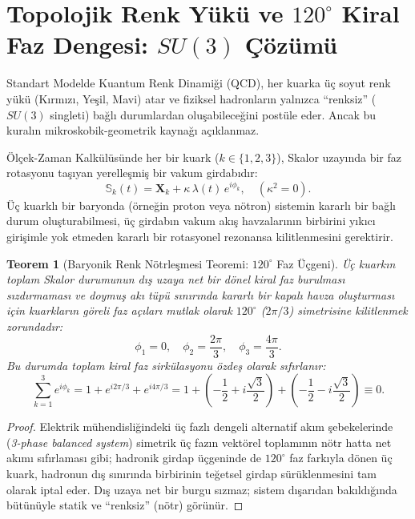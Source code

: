 \documentclass[11pt,a4paper]{article}
\newtheorem{theorem}{Teorem}[section]
\begin{document}
\section{Topolojik Renk Yükü ve \texorpdfstring{$120^\circ$}{120 Derece} Kiral Faz Dengesi: \texorpdfstring{$SU(3)$}{SU(3)} Çözümü}
\label{sec:topolojik_renk_yuku_p3}

Standart Modelde Kuantum Renk Dinamiği (QCD), her kuarka üç soyut renk yükü (Kırmızı, Yeşil, Mavi) atar ve fiziksel hadronların yalnızca ``renksiz'' ($SU(3)$ singleti) bağlı durumlardan oluşabileceğini postüle eder. Ancak bu kuralın mikroskobik-geometrik kaynağı açıklanmaz.

Ölçek-Zaman Kalkülüsünde her bir kuark ($k \in \{1, 2, 3\}$), Skalor uzayında bir faz rotasyonu taşıyan yerelleşmiş bir vakum girdabıdır:
\begin{equation}
    \mathbb{S}_k(t) = \mathbf{X}_k + \kappa \, \lambda(t) \, e^{i \phi_k}, \quad (\kappa^2 = 0).
    \label{eq:kuark_skalor_faz_p3}
\end{equation}
Üç kuarklı bir baryonda (örneğin proton veya nötron) sistemin kararlı bir bağlı durum oluşturabilmesi, üç girdabın vakum akış havzalarının birbirini yıkıcı girişimle yok etmeden kararlı bir rotasyonel rezonansa kilitlenmesini gerektirir.

\begin{theorem}[Baryonik Renk Nötrleşmesi Teoremi: $120^\circ$ Faz Üçgeni]
    \label{thm:renk_notrlesmesi_p3}
    Üç kuarkın toplam Skalor durumunun dış uzaya net bir dönel kiral faz burulması sızdırmaması ve doymuş akı tüpü sınırında kararlı bir kapalı havza oluşturması için kuarkların göreli faz açıları mutlak olarak $120^\circ$ ($2\pi/3$) simetrisine kilitlenmek zorundadır:
    \begin{equation}
        \phi_1 = 0, \quad \phi_2 = \frac{2\pi}{3}, \quad \phi_3 = \frac{4\pi}{3}.
        \label{eq:faz_acilari_120_p3}
    \end{equation}
    Bu durumda toplam kiral faz sirkülasyonu özdeş olarak sıfırlanır:
    \begin{equation}
        \sum_{k=1}^3 e^{i \phi_k} = 1 + e^{i 2\pi/3} + e^{i 4\pi/3} = 1 + \left( -\frac{1}{2} + i\frac{\sqrt{3}}{2} \right) + \left( -\frac{1}{2} - i\frac{\sqrt{3}}{2} \right) \equiv 0.
        \label{eq:renk_faz_toplami_p3}
    \end{equation}
\end{theorem}

\begin{proof}
    Elektrik mühendisliğindeki üç fazlı dengeli alternatif akım şebekelerinde (\textit{3-phase balanced system}) simetrik üç fazın vektörel toplamının nötr hatta net akımı sıfırlaması gibi; hadronik girdap üçgeninde de $120^\circ$ faz farkıyla dönen üç kuark, hadronun dış sınırında birbirinin teğetsel girdap sürüklenmesini tam olarak iptal eder. Dış uzaya net bir burgu sızmaz; sistem dışarıdan bakıldığında bütünüyle statik ve ``renksiz'' (nötr) görünür.
\end{proof}
\end{document}
